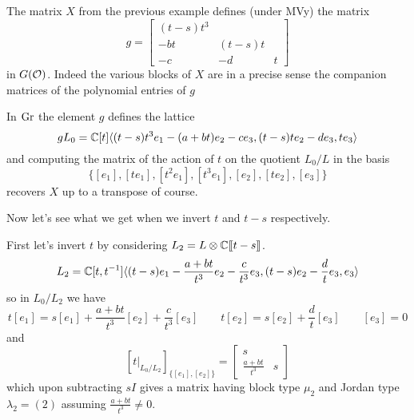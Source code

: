 \documentclass{article}
\begin{document}
\begin{example}
    The matrix $X$ from the previous example defines (under MVy) the matrix 
    \[
        g = \begin{bmatrix}
            (t-s)t^3 \\
            -bt & (t-s)t \\
            -c & -d & t 
        \end{bmatrix}
    \]
    in $G(\mathcal O)$. 
    Indeed the various blocks of $X$ are in a precise sense the companion matrices of the polynomial entries of $g$

    In $\operatorname{Gr}$ the element $g$ defines the lattice 
    \[
        gL_0 = \mathbb C[t]\langle
        (t-s)t^3e_1 - (a+bt) e_2 - ce_3 , (t-s)te_2 - de_3, te_3 
        \rangle
    \]
    and computing the matrix of the action of $t$ on the quotient $L_0/L$ in the basis 
    \[
    \{
        [e_1],[te_1],[t^2e_1],[t^3e_1],[e_2],[te_2],[e_3]
    \}    
    \]
    recovers $X$ up to a transpose of course. 

    Now let's see what we get when we invert $t$ and $t-s$ respectively. 

    First let's invert $t$ by considering $L_2 = L\otimes\mathbb C[\hspace{-.12em}[ {t-s} ]\hspace{-.12em}]$. 
    \[
        L_2  = \mathbb C[t,t^{-1}]\langle(t-s) e_1 -\frac{a+bt}{t^3} e_2 - \frac c {t^3} e_3, (t-s) e_2 - \frac d t e_3, e_3 \rangle
    \]
    so in $L_0/L_2$ we have 
    \[
    t[e_1] = s[e_1] + \frac{a+bt}{t^3} [e_2] + \frac c {t^3}  [e_3] \qquad t[e_2] = s[e_2] + \frac d t[e_3]    \qquad [e_3] = 0 
    \]
    and
    \[
    \left[t\big|_{L_0/L_2}\right]_{\{[e_1],[e_2]\}} = \begin{bmatrix}
        s \\
        \frac{a+bt}{t^3} & s 
    \end{bmatrix}
    \]
    which upon subtracting $s I$ gives a matrix having block type $\mu_2$ and Jordan type $\lambda_2 = (2)$ assuming $\frac{a+bt}{t^3}\ne 0$. 
    

\end{example}
\end{document}
